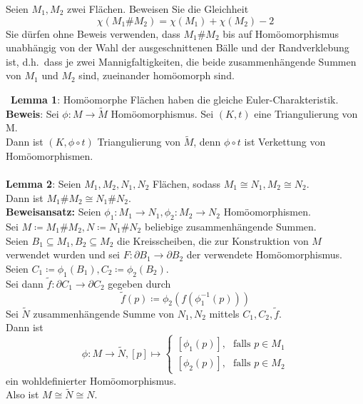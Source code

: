 \begin{assignment}
  Seien \( M_1, M_2 \) zwei Flächen. Beweisen Sie die Gleichheit 
  \begin{equation*}
    \chi(M_1 \# M_2) = \chi(M_1) + \chi(M_2) - 2
  \end{equation*}
  Sie dürfen ohne Beweis verwenden, dass \( M_1 \# M_2 \) bis auf Homöomorphismus unabhängig von der Wahl der ausgeschnittenen Bälle und der Randverklebung ist, d.h.\ dass je zwei Mannigfaltigkeiten, die beide zusammenhängende Summen von \( M_1 \) und \( M_2 \) sind, zueinander homöomorph sind.
\end{assignment}
\begin{solution}
  \
  \textbf{Lemma 1}: Homöomorphe Flächen haben die gleiche Euler-Charakteristik. \\
  \textbf{Beweis}: Sei \( \phi : M \to \tilde{M} \) Homöomorphismus. Sei \( (K,t) \) eine Triangulierung von M. \\
  Dann ist \( (K,\phi \circ t) \) Triangulierung von \( \tilde{M} \), denn \( \phi \circ t \) ist Verkettung von Homöomorphismen. \\
  \  \\
  \textbf{Lemma 2}: Seien \( M_1, M_2, N_1, N_2 \) Flächen, sodass \( M_1 \cong N_1, M_2 \cong N_2 \). \\
  Dann ist \( M_1 \# M_2 \cong N_1 \# N_2 \). \\
  \textbf{Beweisansatz:} Seien \( \phi_1: M_1 \to N_1, \phi_2: M_2 \to N_2 \) Homöomorphismen. \\
  Sei \( M \coloneqq M_1 \# M_2 , N \coloneqq N_1 \# N_2 \) beliebige zusammenhängende Summen. \\
  Seien \( B_1 \subseteq M_1, B_2 \subseteq M_2 \) die Kreisscheiben, die zur Konstruktion von \( M \) verwendet wurden und sei \( F: \partial B_1 \to \partial B_2 \) der verwendete Homöomorphismus. \\
  Seien \( C_1 \coloneqq \phi_1 (B_1), C_2 \coloneqq \phi_2 (B_2) \). \\
  Sei dann \( \tilde{f} : \partial C_1 \to \partial C_2 \) gegeben durch 
  \begin{equation*}
    \tilde{f}(p) \coloneqq \phi_2 (f(\phi_1^{-1}(p)))
  \end{equation*}
  Sei \( \tilde{N} \) zusammenhängende Summe von \( N_1, N_2 \) mittels \( C_1, C_2, \tilde{f} \). \\
  Dann ist
  \begin{equation*}
    \phi: M \to \tilde{N}, [p] \mapsto \begin{cases}
      [\phi_1(p)]\text{,} &\text{falls } p \in M_1 \\
      [\phi_2(p)]\text{,} &\text{falls } p \in M_2
    \end{cases}
  \end{equation*}
  ein wohldefinierter Homöomorphismus. \\
  Also ist \( M \cong \tilde{N} \cong N \). \\
  

\end{solution}

